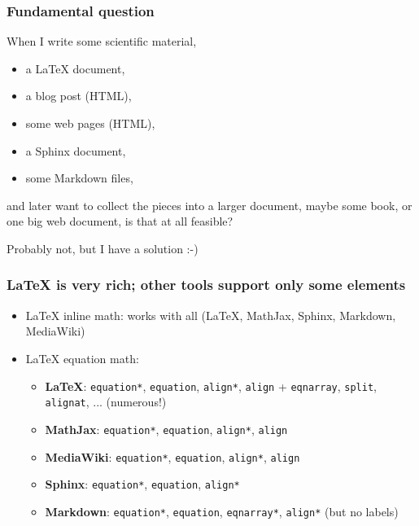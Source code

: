 \documentclass{beamer}
\begin{document}
\begin{frame}
\frametitle{Fundamental question}

When I write some scientific material,

\begin{itemize}
 \item a {\LaTeX} document,

 \item a blog post (HTML),

 \item some web pages (HTML),

 \item a Sphinx document,

 \item some Markdown files,
\end{itemize}

\noindent
and later want to collect the pieces into a larger document, maybe
some book, or one big web document, is that at all feasible?

\pause
Probably not, but I have a solution :-)
\end{frame}

\begin{frame}
\frametitle{{\LaTeX} is very rich; other tools support only some elements}

\begin{itemize}
 \item {\LaTeX} inline math: works with all ({\LaTeX}, MathJax, Sphinx, Markdown, MediaWiki)

 \item {\LaTeX} equation math:
\begin{itemize}

    \item \textbf{LaTeX}: \texttt{equation*}, \texttt{equation}, \texttt{align*}, \texttt{align} +
      \texttt{eqnarray}, \texttt{split}, \texttt{alignat}, ... (numerous!)

    \item \textbf{MathJax}: \texttt{equation*}, \texttt{equation}, \texttt{align*}, \texttt{align}

    \item \textbf{MediaWiki}: \texttt{equation*}, \texttt{equation}, \texttt{align*}, \texttt{align}

    \item \textbf{Sphinx}: \texttt{equation*}, \texttt{equation}, \texttt{align*}

    \item \textbf{Markdown}: \texttt{equation*}, \texttt{equation}, \texttt{eqnarray*}, \texttt{align*} (but no labels)
\end{itemize}

\noindent
\end{itemize}

\noindent
\end{frame}
\end{document}
